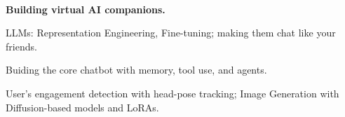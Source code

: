 \\
\vspace{-.2em}
\begin{xitemize}
    \item \textbf{Building virtual AI companions.}
    \begin{zitemize}
        \item LLMs: Representation Engineering, Fine-tuning; making them chat like your friends.
        \item Buiding the core chatbot with memory, tool use, and agents.
        \item User's engagement detection with head-pose tracking; Image Generation with
Diffusion-based models and LoRAs.
    \end{zitemize}
\end{xitemize}

